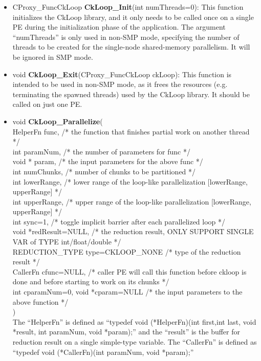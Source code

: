 \begin{itemize}
\item CProxy\_FuncCkLoop \textbf{CkLoop\_Init}(int
numThreads=0): This function initializes the CkLoop library, and it only needs
to be called once on a single PE during the initialization phase of the
application.  The argument ``numThreads'' is only used in non-SMP mode,
specifying the number of threads to be created for the single-node shared-memory
parallelism. It will be ignored in SMP mode.

\item void \textbf{CkLoop\_Exit}(CProxy\_FuncCkLoop ckLoop): This function is
intended to be used in non-SMP mode, as it frees the resources
(e.g. terminating the spawned threads) used by the CkLoop library. It should
be called on just one PE.

\item void \textbf{CkLoop\_Parallelize}( \\
HelperFn func, /* the function that finishes partial work on another thread */ \\
int paramNum, /* the number of parameters for func */\\
void * param, /* the input parameters for the above func */ \\
int numChunks, /* number of chunks to be partitioned */ \\
int lowerRange, /* lower range of the loop-like parallelization [lowerRange, upperRange] */ \\
int upperRange, /* upper range of the loop-like parallelization [lowerRange, upperRange] */ \\
int sync=1, /* toggle implicit barrier after each parallelized loop */ \\
void *redResult=NULL, /* the reduction result, ONLY SUPPORT SINGLE VAR of TYPE int/float/double */ \\
REDUCTION\_TYPE type=CKLOOP\_NONE /* type of the reduction result */ \\
CallerFn cfunc=NULL, /* caller PE will call this function before ckloop is done and before starting to work on its chunks */ \\
int cparamNum=0, void *cparam=NULL /* the input parameters to the above function */ \\
) \\
The ``HelperFn'' is defined as ``typedef void (*HelperFn)(int first,int last, void *result, int paramNum, void *param);''
and the ``result'' is the buffer for reduction result on a single simple-type variable.
The ``CallerFn'' is defined as ``typedef void (*CallerFn)(int paramNum, void *param);''
\end{itemize}

